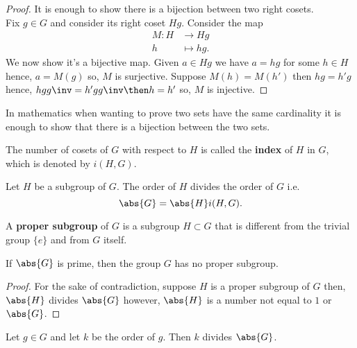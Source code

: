 \documentclass[12pt, a4paper]{article}
\begin{document}
\begin{proof}
    It is enough to show there is a bijection between two right cosets. \\
    Fix \(g \in G\) and consider its right coset \(Hg\). Consider the map
    \[\begin{aligned}
        M : H &\to Hg \\
        h &\mapsto hg.
    \end{aligned}\]
    We now show it's a bijective map. Given \(a \in Hg\) we have \(a =hg\) for some \(h \in H\) hence, \(a= M(g)\) so, \(M\) is surjective. Suppose \(M(h)=M(h')\) then \(hg=h'g\) hence, \(hgg\inv=h'gg\inv \then h=h'\) so, \(M\) is injective.
\end{proof}

\begin{mdnote}
    In mathematics when wanting to prove two sets have the same cardinality it is enough to show that there is a bijection between the two sets.
\end{mdnote}

\begin{definition}
    The number of cosets of \(G\) with respect to \(H\) is called the \textbf{index} of \(H\) in \(G\), which is denoted by \(i(H,G)\).
\end{definition}

\begin{mdthm}
    Let \(H\) be a subgroup of \(G\). The order of \(H\) divides the order of \(G\) i.e. \[\abs{G}=\abs{H} i(H,G).\]
\end{mdthm}

\begin{definition}
    A \textbf{proper subgroup} of \(G\) is a subgroup \(H \subset G\) that is different from the trivial group \(\{e\}\) and from \(G\) itself.
\end{definition}

\begin{corollary}
    If \(\abs{G}\) is prime, then the group \(G\) has no proper subgroup.
\end{corollary}

\begin{proof}
    For the sake of contradiction, suppose \(H\) is a proper subgroup of \(G\) then, \(\abs{H}\) divides \(\abs{G}\) however, \(\abs{H}\) is a number not equal to \(1\) or \(\abs{G}\).
\end{proof}

\begin{corollary}
    Let \(g \in G\) and let \(k\) be the order of \(g\). Then \(k\) divides \(\abs{G}\).
\end{corollary}
\end{document}
